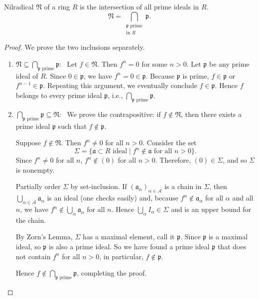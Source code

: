 \begin{proposition}
    Nilradical \(\mathfrak{N}\) of a ring \(R\) is the intersection of all prime ideals in \(R\).
    \[
        \mathfrak{N} = \bigcap_{\substack{\mathfrak{p} \text{ prime} \\ \text{in } R}} \mathfrak{p}.
    \] 
\end{proposition}
\begin{proof}
    We prove the two inclusions separately.

    \begin{enumerate}[label=\textit{Step} \arabic*., leftmargin=*]

\item \(\mathfrak{N} \subseteq \bigcap_{\mathfrak{p} \text{ prime}} \mathfrak{p}\):  
    Let \(f \in \mathfrak{N}\). Then \(f^n = 0\) for some \(n > 0\). Let \(\mathfrak{p}\) be any prime ideal of \(R\). Since \(0 \in \mathfrak{p}\), we have \(f^n = 0 \in \mathfrak{p}\). Because \(\mathfrak{p}\) is prime, \(f \in \mathfrak{p}\) or \(f^{n-1} \in \mathfrak{p}\). Repeating this argument, we eventually conclude \(f \in \mathfrak{p}\). Hence \(f\) belongs to every prime ideal \(\mathfrak{p}\), i.e., \(\bigcap_{\mathfrak{p} \text{ prime}} \mathfrak{p} \).

\item \(\bigcap_{\mathfrak{p} \text{ prime}} \mathfrak{p} \subseteq \mathfrak{N}\):  
We prove the contrapositive: if \(f \notin \mathfrak{N}\), then there exists a prime ideal \(\mathfrak{p}\) such that \(f \notin \mathfrak{p}\).

Suppose \(f \notin \mathfrak{N}\). Then \(f^n \neq 0\) for all \(n > 0\). Consider the set
\[
    \Sigma = \{ \mathfrak{a} \subset  R \text{ ideal} \mid f^n \notin \mathfrak{a} \text{ for all } n > 0 \}.
\]
Since \(f^n \neq 0\) for all \(n\), \(f^n \not\in (0)\) for all \(n > 0\). Therefore, \((0) \in \Sigma\), and so \(\Sigma\) is nonempty.

Partially order \(\Sigma\) by set-inclusion. If \((\mathfrak{a}_\alpha)_{\alpha \in \mathcal{A}}\) is a chain in \(\Sigma\), then \(\bigcup_{\alpha \in \mathcal{A}} \mathfrak{a}_\alpha\) is an ideal (one checks easily) and, because \(f^n \notin \mathfrak{a}_\alpha\) for all \(\alpha\) and all \(n\), we have \(f^n \notin \bigcup_{\alpha} \mathfrak{a}_\alpha\) for all \(n\). Hence \(\bigcup_{\alpha} I_\alpha \in \Sigma\) and is an upper bound for the chain.

By Zorn's Lemma, \(\Sigma\) has a maximal element, call it \(\mathfrak{p}\). Since \(\mathfrak{p}\) is a maximal ideal, so \(\mathfrak{p}\) is also a prime ideal. So we have found a prime ideal \(\mathfrak{p}\) that does not contain \(f^n\) for all  \(n > 0\), in particular,  \(f \not\in \mathfrak{p}\).

Hence \(f \notin \bigcap_{\mathfrak{p} \text{ prime}} \mathfrak{p}\), completing the proof.
\end{enumerate}
\end{proof}
